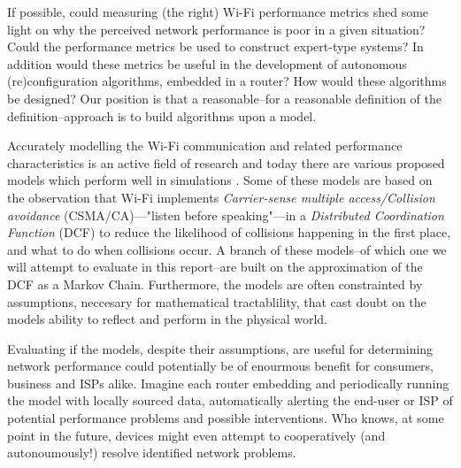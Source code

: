 If possible, could measuring (the right) Wi-Fi performance metrics shed some
light on why the perceived network performance is poor in a given situation?
Could the performance metrics be used to construct expert-type systems? In
addition would these metrics be useful in the development of autonomous
(re)configuration algorithms, embedded in a router? How would these algorithms
be designed? Our position is that a reasonable–for a reasonable definition
of the definition–approach is to build algorithms upon a model.




Accurately modelling the Wi-Fi communication and related performance
characteristics is an active field of research and today there are various
proposed models which perform well in simulations
\cite{bianchi}\cite{felemban}. Some of these models are based on the observation that Wi-Fi implements \emph{Carrier-sense multiple
access/Collision avoidance} (CSMA/CA)—"listen before speaking"—in a
\emph{Distributed Coordination Function} (DCF) to reduce the likelihood of
collisions happening in the first place, and what to do when collisions occur.
A branch of these models–of which one we will attempt to evaluate in this report–are built on the approximation of the DCF as a Markov
Chain. Furthermore, the models are often constrainted by assumptions,
neccesary for mathematical tractablility, that cast doubt on the models
ability to reflect and perform in the physical world.

Evaluating if the models, despite their assumptions, are useful for
determining network performance could potentially be of enourmous benefit for
consumers, business and ISPs alike. Imagine each router embedding and
periodically running the model with locally sourced data, automatically
alerting the end-user or ISP of potential performance problems and possible
interventions. Who knows, at some point in the future, devices might even
attempt to cooperatively (and autonoumously!) resolve identified network
problems.

